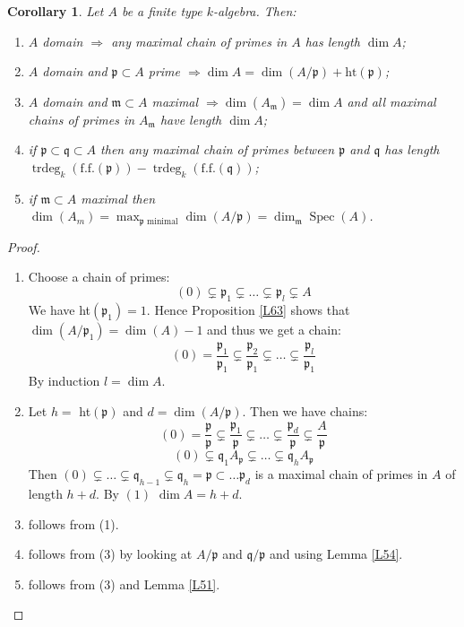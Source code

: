 \documentclass{article}
\newcommand{\fr}{\mathfrak}
\DeclareMathOperator{\trdeg}{trdeg}
\DeclareMathOperator{\Spec}{Spec}
\theoremstyle{plain}
\newtheorem{cor}[thm]{Corollary}
\theoremstyle{definition}
\theoremstyle{remark}
\begin{document}
\begin{cor}
\label{L64}
Let $A$ be a finite type $k$-algebra. Then:
\begin{enumerate} [(1)]
\item $A$ domain $\Rightarrow$ any maximal chain of primes in $A$ has length $\dim A$;
\item $A$ domain and $\fr p \subset A$ prime $\Rightarrow \dim A = \dim(A/\fr p) + \text{ht}(\fr p)$;
\item $A$ domain and $\fr m \subset A$ maximal $\Rightarrow \dim(A_{\fr m}) = \dim A$ and all maximal chains of primes in $A_{\fr m}$ have length $\dim A$;
\item if $\fr p \subset \fr q \subset A$ then any maximal chain of primes between $\fr p$ and $\fr q$ has length $\trdeg_k (\text{f.f.}(\fr p)) - \trdeg_k (\text{f.f.}(\fr q))$;
\item if $\fr m \subset A$ maximal then $\dim(A_m) = \max_{\fr p \text{ minimal}} \dim(A/\fr p) = \dim_{\fr m} \Spec(A)$.
\end{enumerate}
\end{cor}

\begin{proof}
\begin{enumerate} [(1)]
\item Choose a chain of primes:
\[    (0) \subsetneq \fr p_1 \subsetneq \dots \subsetneq \fr p_l \subsetneq A    \]
We have ht$(\fr p_1) = 1$. Hence Proposition \ref{L63} shows that $\dim(A/\fr p_1) = \dim(A) - 1$ and thus we get a chain:
\[    (0) = \frac{\fr p_1}{\fr p_1} \subsetneq \frac{\fr p_2}{\fr p_1} \subsetneq \dots \subsetneq \frac{\fr p_l}{\fr p_1}    \]
By induction $l = \dim A$.
\item Let $h =$ ht$(\fr p)$ and $d = \dim(A/\fr p)$. Then we have chains:
\[           (0) = \frac{\fr p}{\fr p} \subsetneq \frac{\fr p_1}{\fr p} \subsetneq \dots \subsetneq \frac{\fr p_d}{\fr p} \subsetneq  \frac{A}{\fr p}      \]
\[     (0) \subsetneq \fr q_1 A_{\fr p}  \subsetneq \dots \subsetneq \fr q_h A_{\fr p}   \]
Then $(0) \subsetneq \dots \subsetneq \fr q_{h-1} \subsetneq \fr q_h = \fr p \subset \dots \fr p_d$ is a maximal chain of primes in $A$ of length $h+d$. By $(1)$ $\dim A = h+d$.
\item follows from (1).
\item follows from (3) by looking at $A/\fr p$ and $\fr q/\fr p$ and using Lemma \ref{L54}.
\item follows from (3) and Lemma \ref{L51}.
\end{enumerate}
\end{proof}
\end{document}
